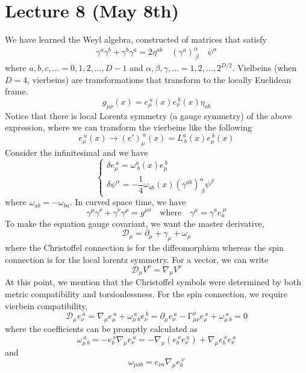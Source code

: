 \section{Lecture 8 (May 8th)}
\begin{recall}
We have learned the Weyl algebra, constructed of matrices that satisfy
\begin{align*}
\gamma ^{a}\gamma ^{b}+\gamma ^{b}\gamma ^{a}=2\eta ^{ab}\quad
(\gamma ^{a})^{\alpha }_{\ \beta }\quad
\psi ^{\alpha }
\end{align*}
where $a,b,c,\ldots =0,1,2,\ldots ,D-1$ and $\alpha, \beta, \gamma ,\ldots =1,2,\ldots ,2^{D/2}$. Vielbeins (when $D=4$, vierbeins) are transformations that transform to the locally Euclidean frame.
\[g_{\mu \nu }(x)=e_{\mu }^{\ a}(x)e_{\nu }^{\ b}(x)\eta _{ab}\]
Notice that there is local Lorentz symmetry (a gauge symmetry) of the above expression, where we can transform the vierbeins like the following
\[e^{\ a }_{\mu }(x)\rightarrow (e')_{\mu }^{\ a }(x)=L^{a}_{\ b}(x)e_{\mu }^{\ b}(x)\]
Consider the infinitesimal and we have
\[\begin{cases}
\delta e_{\mu }^{\ a}=\omega ^{a}_{\ b}(x)e_{\mu }^{\ b}\\
\delta \psi ^{\alpha }=-\dfrac{1}{4}\omega _{ab}(x)(\gamma ^{ab})^{\alpha }_{\ \beta }\psi ^{\beta }
\end{cases}\]
where $\omega _{ab}=-\omega_{ba}$. In curved space time, we have
\[\gamma ^{\mu }\gamma ^{\nu }+\gamma ^{\nu }\gamma ^{\mu }=g^{\mu \nu }\quad \mathrm{where}\quad \gamma ^{\mu }=\gamma ^{a}e_{a}^{\ \mu }\]
To make the equation gauge covariant, we want the master derivative,
\[\mathcal{D}_{\mu }=\partial _{\mu }+\gamma _{\mu }+\omega _{\mu }\]
where the Christoffel connection is for the diffeomorphism whereas the spin connection is for the local lorentz symmetry. For a vector, we can write
\[\mathcal{D}_{\mu }V^{\nu }=\nabla _{\mu }V^{\nu }\]
At this point, we mention that the Christoffel symbols were determined by both metric compatibility and torsionlessness. For the spin connection, we require vierbein compatibility,
\[\mathcal{D}_{\mu }e_{\nu }^{\ a}=\nabla _{\mu }e_{\mu }^{\ a}+\omega _{\mu\ b }^{\ a}e_{\nu }^{\ b}=\partial _{\mu }e_{\nu }^{\ a}-\mathrm{\Gamma} ^{\rho }_{\mu \nu }e_{\rho }^{\ a}+\omega _{\mu\ b }^{\ a}=0\]
where the coefficients can be promptly calculated as
\[\omega _{\mu \ b}^{\ a}=-e_{b}^{\ \nu }\nabla _{\mu }e_{\nu }^{\ a}=-\nabla _{\mu }(e_{b}^{\ \nu }e_{\nu }^{\ a})+\nabla _{\mu }e_{b}^{\ \nu }e_{\nu }^{\ a}\]
and
\[\omega _{\mu ab}=e_{\nu a}\nabla _{\mu }e_{b}^{\ \nu }\]

\end{recall}
